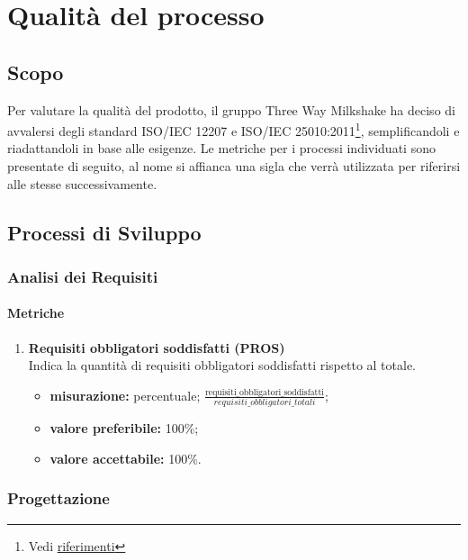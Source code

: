 \section{Qualità del processo}

\subsection{Scopo}
    Per valutare  la qualità del prodotto, il gruppo Three Way Milkshake ha deciso di avvalersi degli standard ISO/IEC 12207 e ISO/IEC 25010:2011\footnote{Vedi \hyperref[ref]{riferimenti}}, semplificandoli e riadattandoli in base alle esigenze. Le metriche per i processi individuati sono presentate di seguito, al nome si affianca una sigla che verrà utilizzata per riferirsi alle stesse successivamente.

\subsection{Processi di Sviluppo}

	\subsubsection{Analisi dei Requisiti}
		\paragraph{Metriche}
		\begin{enumerate}
		\item []
			 \textbf{Requisiti obbligatori soddisfatti (PROS)}\\
			Indica la quantità di requisiti obbligatori soddisfatti rispetto al totale.
			\begin{itemize}
				\item \textbf{misurazione:} percentuale; $\frac{\text{requisiti\_obbligatori\_soddisfatti}}{requisiti\_obbligatori\_totali}$; %
				\item \textbf{valore preferibile:} 100\%;
				\item \textbf{valore accettabile:} 100\%.
			\end{itemize}
		\end{enumerate}
	\subsubsection{Progettazione}
